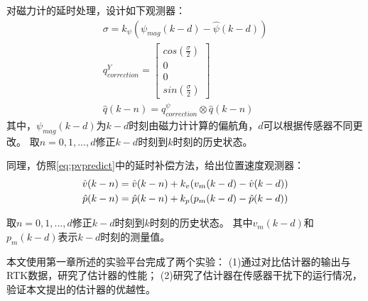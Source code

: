 \documentclass[
  type=master
]{gdutthesis}
\begin{document}
对磁力计的延时处理，设计如下观测器：\vspace{1ex}
\begin{gather}\label{eq:myyawcorrection}
		\sigma = k_{\psi} (\psi_{mag}(k-d) - \hat{\psi}(k-d)) \\
		q_{correction}^{Y} = \begin{bmatrix}
			cos(\frac{\sigma}{2}) \\
			0 \\
			0 \\
			sin(\frac{\sigma}{2})
		\end{bmatrix}\\
		\hat{q}(k-n) = q_{correction}^{\psi} \otimes \hat{q}(k-n)
\end{gather}
其中，$\psi_{mag}(k-d)$为$k-d$时刻由磁力计计算的偏航角，$d$可以根据传感器不同更改。
取$n=0,1,...,d$修正$k-d$时刻到$k$时刻的历史状态。

同理，仿照\autoref{eq:pvpredict}中的延时补偿方法，给出位置速度观测器：\vspace{1ex}
\begin{gather}\label{eq:mypvcorrection}
		\hat{v}(k-n) = \hat{v}(k-n) + k_v (v_m(k-d) - \hat{v}(k-d))\\
		\hat{p}(k-n) = \hat{p}(k-n) + k_p (p_m(k-d) - \hat{p}(k-d))\vspace{1ex}
\end{gather}
取$n=0,1,...,d$修正$k-d$时刻到$k$时刻的历史状态。
其中$v_m(k-d)$和$p_m(k-d)$表示$k-d$时刻的测量值。

本文使用第一章所述的实验平台完成了两个实验：
(1)通过对比估计器的输出与RTK数据，研究了估计器的性能；
(2)研究了估计器在传感器干扰下的运行情况，验证本文提出的估计器的优越性。
\end{document}
